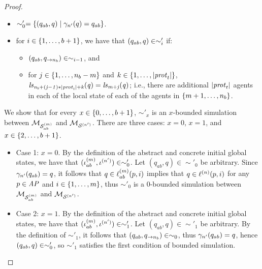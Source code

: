 \documentclass{article}
\begin{document}
\begin{proof}
\begin{itemize}

    \item  $\sim'_0 = \left \{ (q_{ab}, q) \mid  \gamma_{n'}(q) = q_{ab} \right \}$.


  \item for $i \in \left \{ 1, \ldots, b + 1 \right \}$, we have that $(q_{ab}, q) \in
  \sim'_i$ if:
  \begin{itemize}
    \item  $(q_{ab},q_{\rightarrow n_b}) \in \sim_{i-1}$, and 
    \item  for $j \in \left \{ 1,\ldots,n_b - m \right \}$ and $k \in \left \{ 1,\ldots,|\mathit{prot}_{t}| \right \}$, 
    $\it{ls}_{n_b + (j - 1) * |\mathit{prot}_{t}| + k}(q) = \it{ls}_{m+j}(q)$; i.e., there are
          additional $|\mathit{prot}_{t}|$  agents in each of the local state of each of
          the agents in $\left \{ m+1,\ldots,n_b \right \}$.
  \end{itemize}
\end{itemize}

We show that for every $x \in \left \{ 0, \ldots, b+1 \right \}$, $\sim'_x$ is an
$x$-bounded simulation between $\mathcal{M}_{\mathcal{S}_{ab}^{(m)}}$ and $\mathcal{M}_{\mathcal{S}^{(n')}}$. There are three
cases: $x=0$, $x=1$, and $x \in \left \{ 2,\ldots,b+1 \right \}$.
    
\begin{itemize}
  \item Case 1: $x=0$. By the definition of the abstract and concrete initial
      global states, we have that $(\iota^{({m})}_{ab}, \iota^{({n'})}) \in
        \sim'_0$. Let $(q_{ab}, q) \in \sim'_0$ be arbitrary. Since
        $\gamma_{n'}(q_{ab}) = q$, it follows that $q \in \ell^{(m)}_{ab}(p,
        i)$ implies that $q \in \ell^{(n)} (p, i)$ for any $p \in \it{AP}$
        and $i \in \left \{ 1,\ldots,m \right \}$, thus $\sim'_0$ is a $0$-bounded
        simulation between $\mathcal{M}_{\mathcal{S}_{ab}^{(m)}}$ and $\mathcal{M}_{\mathcal{S}^{(n')}}$.


  \item Case 2: $x = 1$.   By the definition of the abstract and concrete
      initial global states, we have that $(\iota^{({m})}_{ab}, \iota^{({n'})})
        \in \sim'_1$. Let $(q_{ab}, q) \in \sim'_1$ be arbitrary. By the
        definition of $\sim'_1$, it follows that $(q_{ab},
        q_{\rightarrow n_b}) \in \sim_{0}$, thus $\gamma_{n'}(q_{ab}) = q$,
        hence  $(q_{ab}, q) \in \sim'_0$, so $\sim'_1$ satisfies the first
        condition of bounded simulation. 



\end{itemize}
\end{proof}
\end{document}
